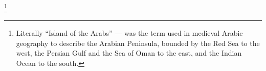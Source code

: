 \footnote{Literally \enquote{Island of the Arabs} --- was the term used in medieval Arabic geography to describe the Arabian Peninsula, bounded by the Red Sea to the west, the Persian Gulf and the Sea of Oman to the east, and the Indian Ocean to the south.}